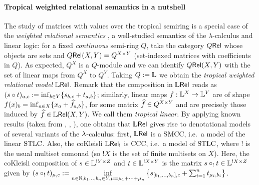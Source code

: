 \documentclass[submission,%
]{eptcs}
\begin{document}
\paragraph{Tropical weighted relational semantics in a nutshell}

The study of matrices with values over the tropical semiring is a special case of the
\emph{weighted relational semantics} \cite{Manzo2013}, a well-studied semantics of the $\lambda$-calculus and linear logic:
for a fixed \emph{continuous} semi-ring $Q$, take the category $Q \mathsf{Rel}$ whose objects are sets and ${Q \mathsf{Rel}}(X,Y)=Q^{X\times Y}$ (set-indexed matrices with coefficients in $Q$). %
As expected, $Q^X$ is a $Q$-module and we can identify ${Q \mathsf{Rel}}(X,Y)$ with the set of linear maps from $Q^X$ to $Q^Y$.
Taking $Q:=\mathbb{L}$ we obtain the \emph{tropical weighted relational model} $\mathbb{L} \mathsf{Rel}$.
Remark that the composition in $\mathbb{L} \mathsf{Rel}$ %
reads as \ $(s\circ t)_{a,c}:=\inf_{b\in Y}\{s_{b,c}+t_{a,b}\}$;
similarly, linear maps $f:\mathbb{L}^X\to \mathbb{L}^Y$ are of shape $f(x)_b=\inf_{a\in X} \{x_a+\widehat{f}_{a,b}\}$, for some matrix $\widehat{f}\in Q^{X\times Y}$ and are precisely those induced by $\widehat{f}\in{\mathbb{L}\mathsf{Rel}}(X,Y)$. We call them \emph{tropical linear}.
By applying known results (taken from \cite{Manzo2013}, \cite{Laird2020}, \cite{LemayCALCO2021}), one obtains that $\mathbb{L} \mathsf{Rel}$ gives rise to denotational models of several variants of the $\lambda$-calculus:
first, $\mathbb{L} \mathsf{Rel}$ is a SMCC, i.e.\ a model of the linear $\mathrm{STLC}$.
Also, the coKleisli $\mathbb{L} \mathsf{Rel}_!$ is CCC, i.e.\ a model of $\mathrm{STLC}$, where $!$ is the usual multiset comonad (so $!X$ is the set of finite multisets on $X$).
Here, the coKleisli composition of $s\in\mathbb{L}^{!Y\times Z}$ and $t\in\mathbb{L}^{!X\times Y}$ is the matrix $s\circ_! t\in\mathbb{L}^{!X\times Z}$ given by
$(s\circ_! t)_{\mu,c}:=
 \inf\limits_{n\in\mathbb{N}, b_1\dots,b_n\in Y, \mu = \mu_1+\cdots +\mu_n}
 \left\{s_{[b_1,\dots,b_n],c} + \sum_{i=1}^n t_{\mu_i,b_i}\right\}$.
\end{document}
